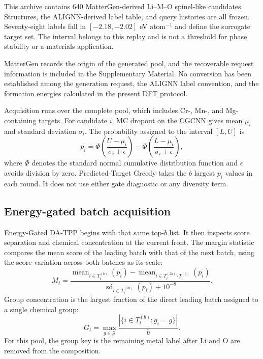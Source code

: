 This archive contains 640 MatterGen-derived Li--M--O spinel-like
candidates. Structures, the ALIGNN-derived label table, and query histories are
all frozen. Seventy-eight labels fall in $[-2.18,-2.02]$ eV atom$^{-1}$ and
define the surrogate target set. The interval belongs to this replay and is not
a threshold for phase stability or a materials application.

MatterGen records the origin of the generated pool, and the recoverable request
information is included in the Supplementary Material. No conversion has been
established among the generation request, the ALIGNN label convention, and the
formation energies calculated in the present DFT protocol.

Acquisition runs over the complete pool, which includes Cr-, Mn-, and
Mg-containing targets. For candidate $i$, MC dropout on the CGCNN gives mean
$\mu_i$ and standard deviation $\sigma_i$. The probability assigned to the
interval $[L,U]$ is
\begin{equation}
p_i =
\Phi\!\left(\frac{U-\mu_i}{\sigma_i+\epsilon}\right)
-\Phi\!\left(\frac{L-\mu_i}{\sigma_i+\epsilon}\right),
\label{eq:interval-hit}
\end{equation}
where $\Phi$ denotes the standard normal cumulative distribution function and
$\epsilon$ avoids division by zero. Predicted-Target Greedy takes the $b$
largest $p_i$ values in each round. It does not use either gate diagnostic or
any diversity term.

\subsection{Energy-gated batch acquisition}

Energy-Gated DA-TPP begins with that same top-$b$ list. It then inspects score
separation and chemical concentration at the current front. The margin statistic
compares the mean score of the leading batch with that of the next batch, using
the score variation across both batches as its scale:
\begin{equation}
M_t =
\frac{\operatorname{mean}_{i\in T_t^{(b)}}(p_i)
-\operatorname{mean}_{i\in T_t^{(2b)}\setminus T_t^{(b)}}(p_i)}
{\operatorname{sd}_{i\in T_t^{(2b)}}(p_i)+10^{-8}}.
\label{eq:margin}
\end{equation}
Group concentration is the largest fraction of the direct leading batch
assigned to a single chemical group:
\begin{equation}
G_t=\max_{g\in\mathcal{G}}
\frac{|\{i\in T_t^{(b)}:g_i=g\}|}{b}.
\label{eq:group-concentration}
\end{equation}
For this pool, the group key is the remaining metal label after Li and O are
removed from the composition.

